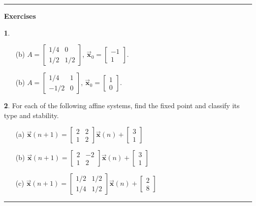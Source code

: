\documentclass[reqno]{immbook}
\newcommand{\BX}{\vec{\textbf{x}}}
\newcommand{\ds}{\displaystyle}
\numberwithin{equation}{chapter}
\numberwithin{question}{section}
\numberwithin{theorem}{chapter}
\numberwithin{figure}{chapter}
\theoremstyle{definition}
\newtheorem{exercise}{}[section]
\newenvironment{exercises}%
{%
\medskip\hrule\medskip\noindent\textbf{Exercises}%
}%
{%
\medskip\hrule
}
\begin{document}
\begin{exercises}
\begin{exercise}
\begin{enumerate}
\item[(b)]
$\ds A  =  \begin{bmatrix}
              1/4 & 0 \\
              1/2 & 1/2
           \end{bmatrix}$, \hspace*{.25cm}
$\ds \BX_0 = \begin{bmatrix} -1 \\ 1 \end{bmatrix}$.
\item[(b)]
$\ds A  =  \begin{bmatrix}
              1/4 & 1 \\
              -1/2 & 0
           \end{bmatrix}$, \hspace*{.25cm} 
$\ds \BX_0 = \begin{bmatrix} 1 \\ 0 \end{bmatrix}$.
\end{enumerate}
\end{exercise}

\begin{exercise}
For each of the following affine systems, find the
fixed point and classify its type and stability.
\begin{enumerate}
\item[(a)] $\ds \BX(n+1) = \begin{bmatrix}
                         2 & 2 \\
                         1 & 2
                     \end{bmatrix}
                        \BX(n) + \begin{bmatrix} 3 \\ 1 \end{bmatrix}$
\item[(b)] $\ds \BX(n+1) = \begin{bmatrix}
                         2 & -2 \\
                         1 & 2
                     \end{bmatrix}
                        \BX(n) + \begin{bmatrix} 3 \\ 1 \end{bmatrix}$
\item[(c)] $\ds \BX(n+1) = \begin{bmatrix}
                         1/2 & 1/2 \\
                         1/4 & 1/2
                     \end{bmatrix}
                        \BX(n) + \begin{bmatrix} 2 \\ 8 \end{bmatrix}$
\end{enumerate}
\end{exercise}
\end{exercises}
\end{document}
